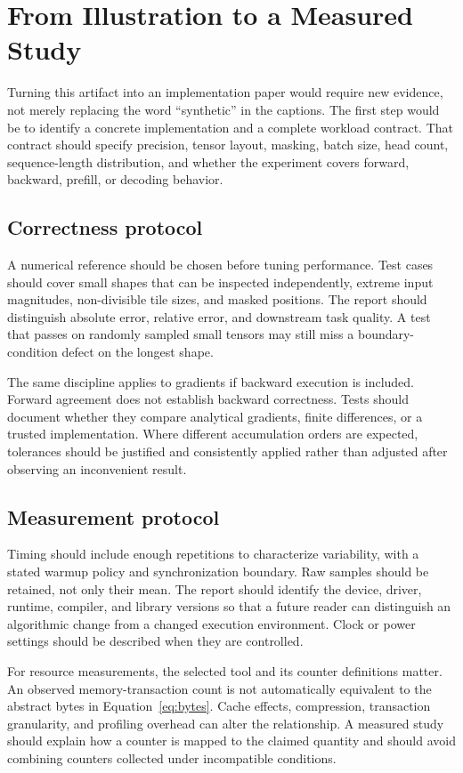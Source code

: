 \section{From Illustration to a Measured Study}
\label{sec:discussion}
Turning this artifact into an implementation paper would require new evidence, not merely replacing the word ``synthetic'' in the captions. The first step would be to identify a concrete implementation and a complete workload contract. That contract should specify precision, tensor layout, masking, batch size, head count, sequence-length distribution, and whether the experiment covers forward, backward, prefill, or decoding behavior.

\subsection{Correctness protocol}
A numerical reference should be chosen before tuning performance. Test cases should cover small shapes that can be inspected independently, extreme input magnitudes, non-divisible tile sizes, and masked positions. The report should distinguish absolute error, relative error, and downstream task quality. A test that passes on randomly sampled small tensors may still miss a boundary-condition defect on the longest shape.

The same discipline applies to gradients if backward execution is included. Forward agreement does not establish backward correctness. Tests should document whether they compare analytical gradients, finite differences, or a trusted implementation. Where different accumulation orders are expected, tolerances should be justified and consistently applied rather than adjusted after observing an inconvenient result.

\subsection{Measurement protocol}
Timing should include enough repetitions to characterize variability, with a stated warmup policy and synchronization boundary. Raw samples should be retained, not only their mean. The report should identify the device, driver, runtime, compiler, and library versions so that a future reader can distinguish an algorithmic change from a changed execution environment. Clock or power settings should be described when they are controlled.

For resource measurements, the selected tool and its counter definitions matter. An observed memory-transaction count is not automatically equivalent to the abstract bytes in Equation~\ref{eq:bytes}. Cache effects, compression, transaction granularity, and profiling overhead can alter the relationship. A measured study should explain how a counter is mapped to the claimed quantity and should avoid combining counters collected under incompatible conditions.


